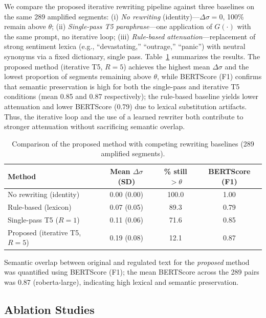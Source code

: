 \documentclass[final,1p,times]{elsarticle}
\begin{document}
We compare the proposed iterative rewriting pipeline against three baselines on the same 289 amplified segments: (i) \emph{No rewriting} (identity)---$\Delta\sigma = 0$, 100\% remain above $\theta$; (ii) \emph{Single-pass T5 paraphrase}---one application of $G(\cdot)$ with the same prompt, no iterative loop; (iii) \emph{Rule-based attenuation}---replacement of strong sentiment lexica (e.g., ``devastating,'' ``outrage,'' ``panic'') with neutral synonyms via a fixed dictionary, single pass. Table~\ref{tab:baselines} summarizes the results. The proposed method (iterative T5, $R=5$) achieves the highest mean $\Delta\sigma$ and the lowest proportion of segments remaining above $\theta$, while BERTScore \cite{zhang2019bertscore} (F1) confirms that semantic preservation is high for both the single-pass and iterative T5 conditions (mean 0.85 and 0.87 respectively); the rule-based baseline yields lower attenuation and lower BERTScore (0.79) due to lexical substitution artifacts. Thus, the iterative loop and the use of a learned rewriter both contribute to stronger attenuation without sacrificing semantic overlap.

\begin{table}[H]
\centering
\caption{Comparison of the proposed method with competing rewriting baselines (289 amplified segments).}
\label{tab:baselines}
\small
\begin{tabular}{lccc}
\toprule
Method & Mean $\Delta\sigma$ (SD) & \% still $> \theta$ & BERTScore (F1) \\
\midrule
No rewriting (identity) & 0.00 (0.00) & 100.0 & 1.00 \\
Rule-based (lexicon) & 0.07 (0.05) & 89.3 & 0.79 \\
Single-pass T5 ($R{=}1$) & 0.11 (0.06) & 71.6 & 0.85 \\
Proposed (iterative T5, $R{=}5$) & 0.19 (0.08) & 12.1 & 0.87 \\
\bottomrule
\end{tabular}
\end{table}

Semantic overlap between original and regulated text for the \emph{proposed} method was quantified using BERTScore \cite{zhang2019bertscore} (F1); the mean BERTScore across the 289 pairs was 0.87 (roberta-large), indicating high lexical and semantic preservation.

\subsection{Ablation Studies}
\end{document}
